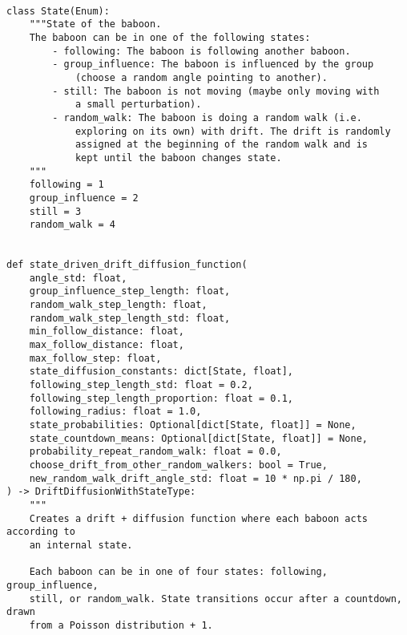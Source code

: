 \documentclass[
    article,
    oneside,
]{memoir}
\begin{document}
\begin{verbatim}

class State(Enum):
    """State of the baboon.
    The baboon can be in one of the following states:
        - following: The baboon is following another baboon.
        - group_influence: The baboon is influenced by the group
            (choose a random angle pointing to another).
        - still: The baboon is not moving (maybe only moving with
            a small perturbation).
        - random_walk: The baboon is doing a random walk (i.e.
            exploring on its own) with drift. The drift is randomly
            assigned at the beginning of the random walk and is
            kept until the baboon changes state.
    """
    following = 1
    group_influence = 2
    still = 3
    random_walk = 4


def state_driven_drift_diffusion_function(
    angle_std: float,
    group_influence_step_length: float,
    random_walk_step_length: float,
    random_walk_step_length_std: float,
    min_follow_distance: float,
    max_follow_distance: float,
    max_follow_step: float,
    state_diffusion_constants: dict[State, float],
    following_step_length_std: float = 0.2,
    following_step_length_proportion: float = 0.1,
    following_radius: float = 1.0,
    state_probabilities: Optional[dict[State, float]] = None,
    state_countdown_means: Optional[dict[State, float]] = None,
    probability_repeat_random_walk: float = 0.0,
    choose_drift_from_other_random_walkers: bool = True,
    new_random_walk_drift_angle_std: float = 10 * np.pi / 180,
) -> DriftDiffusionWithStateType:
    """
    Creates a drift + diffusion function where each baboon acts according to
    an internal state.

    Each baboon can be in one of four states: following, group_influence,
    still, or random_walk. State transitions occur after a countdown, drawn
    from a Poisson distribution + 1.


\end{verbatim}
\end{document}
